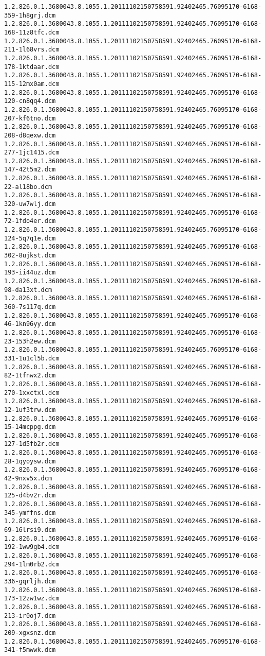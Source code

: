 \begin{lstlisting}
1.2.826.0.1.3680043.8.1055.1.20111102150758591.92402465.76095170-6168-359-1h8grj.dcm 1.2.826.0.1.3680043.8.1055.1.20111102150758591.92402465.76095170-6168-168-11z8tfc.dcm 1.2.826.0.1.3680043.8.1055.1.20111102150758591.92402465.76095170-6168-211-1l68vrs.dcm 1.2.826.0.1.3680043.8.1055.1.20111102150758591.92402465.76095170-6168-178-1ktdaar.dcm 1.2.826.0.1.3680043.8.1055.1.20111102150758591.92402465.76095170-6168-115-12mx0am.dcm 1.2.826.0.1.3680043.8.1055.1.20111102150758591.92402465.76095170-6168-120-cn8qq4.dcm 1.2.826.0.1.3680043.8.1055.1.20111102150758591.92402465.76095170-6168-207-kf6tno.dcm 1.2.826.0.1.3680043.8.1055.1.20111102150758591.92402465.76095170-6168-208-d8qexw.dcm 1.2.826.0.1.3680043.8.1055.1.20111102150758591.92402465.76095170-6168-277-1jc1415.dcm 1.2.826.0.1.3680043.8.1055.1.20111102150758591.92402465.76095170-6168-147-42t5m2.dcm 1.2.826.0.1.3680043.8.1055.1.20111102150758591.92402465.76095170-6168-22-al18bo.dcm 1.2.826.0.1.3680043.8.1055.1.20111102150758591.92402465.76095170-6168-320-uw7wlj.dcm 1.2.826.0.1.3680043.8.1055.1.20111102150758591.92402465.76095170-6168-72-1fdo4er.dcm 1.2.826.0.1.3680043.8.1055.1.20111102150758591.92402465.76095170-6168-124-5q7q1e.dcm 1.2.826.0.1.3680043.8.1055.1.20111102150758591.92402465.76095170-6168-302-8ujkst.dcm 1.2.826.0.1.3680043.8.1055.1.20111102150758591.92402465.76095170-6168-193-ii44uz.dcm 1.2.826.0.1.3680043.8.1055.1.20111102150758591.92402465.76095170-6168-98-da13xt.dcm 1.2.826.0.1.3680043.8.1055.1.20111102150758591.92402465.76095170-6168-360-7s117q.dcm 1.2.826.0.1.3680043.8.1055.1.20111102150758591.92402465.76095170-6168-46-1kn96yy.dcm 1.2.826.0.1.3680043.8.1055.1.20111102150758591.92402465.76095170-6168-23-153h2ew.dcm 1.2.826.0.1.3680043.8.1055.1.20111102150758591.92402465.76095170-6168-331-1u1cl5b.dcm 1.2.826.0.1.3680043.8.1055.1.20111102150758591.92402465.76095170-6168-82-1tfnwx2.dcm 1.2.826.0.1.3680043.8.1055.1.20111102150758591.92402465.76095170-6168-270-1xxctxl.dcm 1.2.826.0.1.3680043.8.1055.1.20111102150758591.92402465.76095170-6168-12-1uf3trw.dcm 1.2.826.0.1.3680043.8.1055.1.20111102150758591.92402465.76095170-6168-15-14mcppg.dcm 1.2.826.0.1.3680043.8.1055.1.20111102150758591.92402465.76095170-6168-127-1d5fb2r.dcm 1.2.826.0.1.3680043.8.1055.1.20111102150758591.92402465.76095170-6168-28-1qyoysw.dcm 1.2.826.0.1.3680043.8.1055.1.20111102150758591.92402465.76095170-6168-42-9nxv5x.dcm 1.2.826.0.1.3680043.8.1055.1.20111102150758591.92402465.76095170-6168-125-d4bv2r.dcm 1.2.826.0.1.3680043.8.1055.1.20111102150758591.92402465.76095170-6168-345-ymffns.dcm 1.2.826.0.1.3680043.8.1055.1.20111102150758591.92402465.76095170-6168-69-16lrsi9.dcm 1.2.826.0.1.3680043.8.1055.1.20111102150758591.92402465.76095170-6168-192-1ww9gb4.dcm 1.2.826.0.1.3680043.8.1055.1.20111102150758591.92402465.76095170-6168-294-1lm0rb2.dcm 1.2.826.0.1.3680043.8.1055.1.20111102150758591.92402465.76095170-6168-336-gqrljh.dcm 1.2.826.0.1.3680043.8.1055.1.20111102150758591.92402465.76095170-6168-173-12zw1wz.dcm 1.2.826.0.1.3680043.8.1055.1.20111102150758591.92402465.76095170-6168-213-ir0oj7.dcm 1.2.826.0.1.3680043.8.1055.1.20111102150758591.92402465.76095170-6168-209-xgxsnz.dcm 1.2.826.0.1.3680043.8.1055.1.20111102150758591.92402465.76095170-6168-341-f5mwwk.dcm 
\end{lstlisting}
